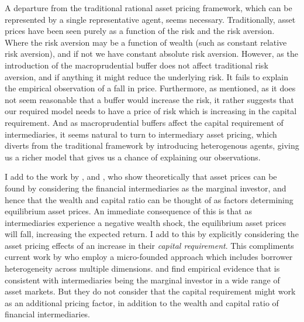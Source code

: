 \documentclass[11pt]{article}
\let\cite=\citet
\begin{document}
A departure from the traditional rational asset pricing framework, which can be represented by a single representative agent, seems necessary. Traditionally, asset prices have been seen purely as a function of the risk and the risk aversion. Where the risk aversion may be a function of wealth (such as constant relative risk aversion), and if not we have constant absolute risk aversion. However, as the introduction of the macroprudential buffer does not affect traditional risk aversion, and if anything it might reduce the underlying risk. It fails to explain the empirical observation of a fall in price. Furthermore, as mentioned, as it does not seem reasonable that a buffer would increase the risk, it rather suggests that our required model needs to have a price of risk which is increasing in the capital requirement. And as macroprudential buffers affect the capital requirement of intermediaries, it seems natural to turn to intermediary asset pricing, which diverts from the traditional framework by introducing heterogenous agents, giving us a richer model that gives us a chance of explaining our observations.
 
I add to the work by \citet{Brunnermeier2009}, \citet{He2013} and \citet{Brunnermeier2014}, who show theoretically that asset prices can be found by considering the financial intermediaries as the marginal investor, and hence that the wealth and capital ratio can be thought of as factors determining equilibrium asset prices. An immediate consequence of this is that as intermediaries experience a negative wealth shock, the equilibrium asset prices will fall, increasing the expected return. I add to this by explicitly considering the asset pricing effects of an increase in their \emph{capital requirement}. This compliments current work by \cite{harris2018aggregate} who employ a micro-founded approach which includes borrower heterogeneity across multiple dimensions. \citet{Adrian2014} and \citet{He2017} find empirical evidence that is consistent with intermediaries being the marginal investor in a wide range of asset markets. But they do not consider that the capital requirement might work as an additional pricing factor, in addition to the wealth and capital ratio of financial intermediaries. 
\end{document}
